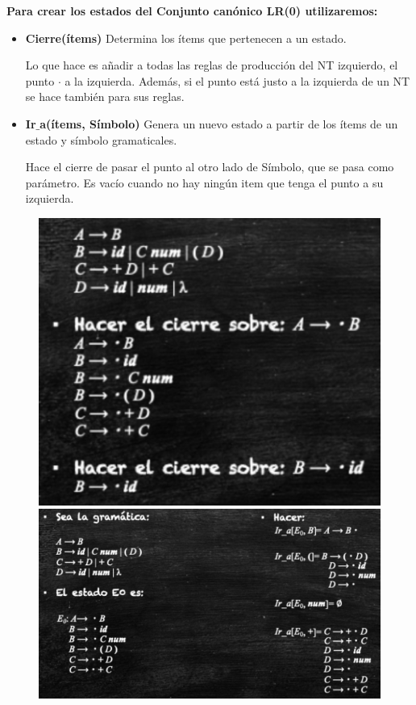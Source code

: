 \documentclass[12pt]{report} %
\begin{document}
\textbf{Para crear los estados del Conjunto canónico LR(0) utilizaremos:}
\begin{itemize}
  \item \textbf{Cierre(ítems)} Determina los ítems que pertenecen a un estado. 
  
  Lo que hace es añadir a todas las reglas de producción del NT izquierdo, el punto $\cdot$ a la izquierda. Además, si el punto está justo a la izquierda de un NT se hace también para sus reglas. 
  
  \item \textbf{Ir$\_$a(ítems, Símbolo)} Genera un nuevo estado a partir de los ítems de un estado y símbolo gramaticales.
  
  Hace el cierre de pasar el punto al otro lado de Símbolo, que se pasa como parámetro. Es vacío cuando no hay ningún item que tenga el punto a su izquierda.
\end{itemize}
\begin{figure}[H]
  {\includegraphics[scale=.4]{2021-03-26 19_10_20-ASintactico.pdf - Foxit Reader.png}
  \includegraphics[scale=.4]{2021-03-26 19_14_19-ASintactico.pdf - Foxit Reader.png}}
\end{figure}
\end{document}
